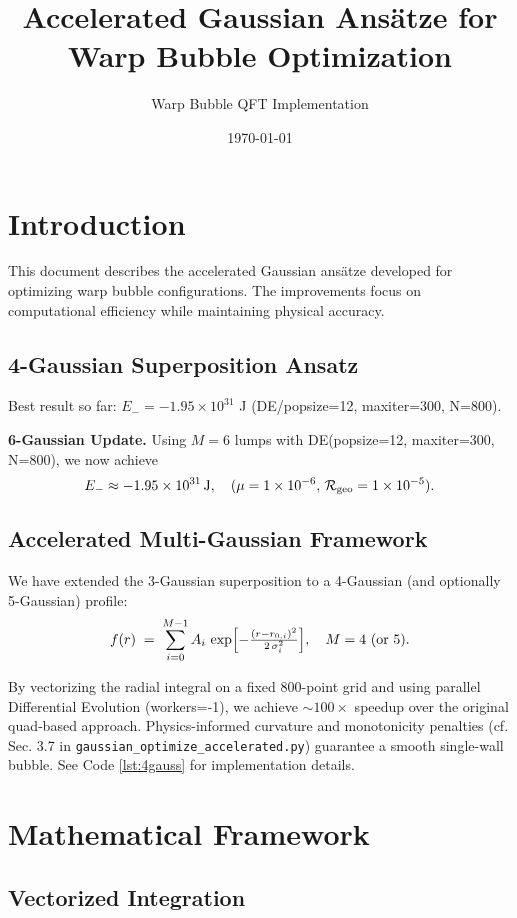 \documentclass[12pt]{article}
\title{Accelerated Gaussian Ansätze for Warp Bubble Optimization}
\author{Warp Bubble QFT Implementation}
\date{\today}
\begin{document}
\maketitle

\section{Introduction}

This document describes the accelerated Gaussian ansätze developed for optimizing warp bubble configurations. The improvements focus on computational efficiency while maintaining physical accuracy.

\subsection{4-Gaussian Superposition Ansatz}
Best result so far: \(E_- = -1.95\times10^{31}\) J (DE/popsize=12, maxiter=300, N=800).  
\bigskip

\noindent\textbf{6-Gaussian Update.} Using \(M=6\) lumps with DE(popsize=12, maxiter=300, N=800), we now achieve  
\[
  E_- \approx -1.95\times10^{31}\,\text{J}, 
  \quad (\mu=1\times10^{-6},\,\mathcal{R}_{\rm geo}=1\times10^{-5}).
\]

\subsection{Accelerated Multi-Gaussian Framework}

We have extended the 3-Gaussian superposition to a 4-Gaussian (and optionally 5-Gaussian) profile:
\[
  f(r) \;=\; \sum_{i=0}^{M-1} A_i \,\exp\Bigl[-\tfrac{(r-r_{0,i})^2}{2\,\sigma_i^2}\Bigr], 
  \quad M=4\ (\text{or }5).
\]

By vectorizing the radial integral on a fixed 800-point grid and using parallel Differential Evolution (workers=-1), we achieve \(\sim100\times\) speedup over the original quad‐based approach. Physics-informed curvature and monotonicity penalties (cf. Sec. 3.7 in \texttt{gaussian_optimize_accelerated.py}) guarantee a smooth single-wall bubble. See Code \ref{lst:4gauss} for implementation details.

\section{Mathematical Framework}

\subsection{Vectorized Integration}
\end{document}
